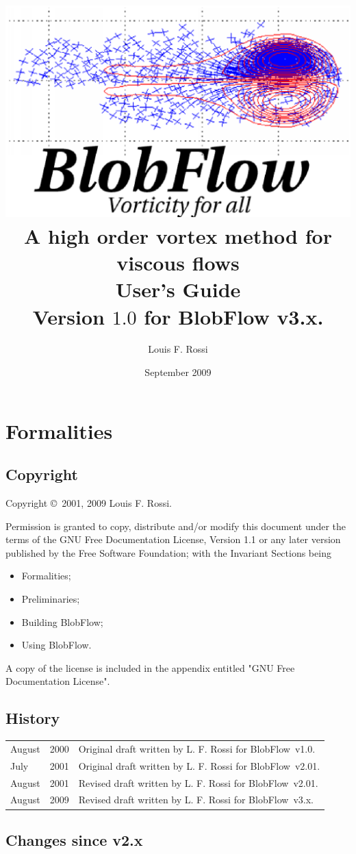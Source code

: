 \documentclass[12pt]{report}
\title{\includegraphics{figs/BlobFlow_logo} \\
 A high order vortex method for viscous flows \\
User's Guide \\ Version $1.0$ for BlobFlow v3.x.}
\author{Louis F. Rossi}
\date{September 2009}
\newcommand{\BF}{BlobFlow}
\begin{document}
\maketitle

\chapter{Formalities}

\section{Copyright}

Copyright \copyright \ 2001, 2009 Louis F. Rossi. 

Permission is granted to copy, distribute
and/or modify this document under the terms of the GNU Free Documentation
License, Version 1.1 or any later version published by the Free Software
Foundation; with the Invariant Sections being 
\begin{itemize}
\item Formalities;

\item Preliminaries;

\item Building \BF;

\item Using \BF.

\end{itemize}
A
copy of the license is included in the appendix entitled "GNU Free
Documentation License".

\section{History}


\begin{tabular}{lll}
August & 2000 & Original draft written by L. F. Rossi for 
\BF~v1.0. \\
July & 2001 & Original draft written by L. F. Rossi for 
\BF~v2.01. \\
August & 2001 & Revised draft written by L. F. Rossi for 
\BF~v2.01. \\
August & 2009 & Revised draft written by L. F. Rossi for 
\BF~v3.x. \\
\end{tabular}

\section{Changes since v2.x}
\end{document}
